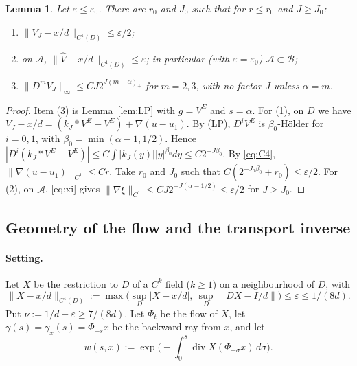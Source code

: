 \documentclass[11pt]{article}
\newtheorem{lemma}[theorem]{Lemma}
\theoremstyle{definition}
\theoremstyle{remark}
\newcommand{\dv}{\operatorname{div}}
\newcommand{\cA}{\mathcal A}
\newcommand{\cB}{\mathcal B}
\begin{document}
\begin{lemma}\label{lem:fields}
Let $\varepsilon\le\varepsilon_0$. There are $r_0$ and $J_0$ such that for $r\le r_0$ and $J\ge J_0$:
\begin{enumerate}[(1)]
\item $\|V_J-x/d\|_{C^1(D)}\le\varepsilon/2$;
\item on $\cA$, $\|\hat V-x/d\|_{C^1(D)}\le\varepsilon$; in particular (with $\varepsilon=\varepsilon_0$) $\cA\subset\cB$;
\item $\|D^mV_J\|_\infty\le CJ2^{J(m-\alpha)_+}$ for $m=2,3$, with no factor $J$ unless $\alpha=m$.
\end{enumerate}
\end{lemma}

\begin{proof}
Item (3) is Lemma~\ref{lem:LP} with $g=V^E$ and $s=\alpha$. For (1), on $D$ we have $V_J-x/d=(k_J*V^E-V^E)+\nabla(u-u_1)$. By (LP), $D^iV^E$ is $\beta_0$-H\"older for $i=0,1$, with $\beta_0=\min(\alpha-1,1/2)$. Hence $|D^i(k_J*V^E-V^E)|\le C\int|k_J(y)||y|^{\beta_0}dy\le C2^{-J\beta_0}$. By \eqref{eq:C4}, $\|\nabla(u-u_1)\|_{C^1}\le Cr$. Take $r_0$ and $J_0$ such that $C(2^{-J_0\beta_0}+r_0)\le\varepsilon/2$. For (2), on $\cA$, \eqref{eq:xi} gives $\|\nabla\xi\|_{C^1}\le CJ2^{-J(\alpha-1/2)}\le\varepsilon/2$ for $J\ge J_0$.
\end{proof}

\subsection{Geometry of the flow and the transport inverse}

\paragraph{Setting.} Let $X$ be the restriction to $D$ of a $C^k$ field ($k\ge1$) on a neighbourhood of $D$, with
\[
\|X-x/d\|_{C^1(D)}:=\max\big(\sup_D|X-x/d|,\ \sup_D\|DX-I/d\|\big)\le\varepsilon\le1/(8d).
\]
Put $\nu:=1/d-\varepsilon\ge7/(8d)$. Let $\Phi_t$ be the flow of $X$, let $\gamma(s)=\gamma_x(s)=\Phi_{-s}x$ be the backward ray from $x$, and let
\[
w(s,x):=\exp\Big(-\int_0^s\dv X(\Phi_{-\sigma}x)\,d\sigma\Big).
\]
\end{document}
